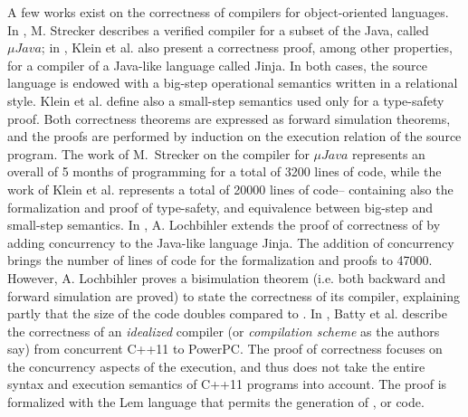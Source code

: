 \documentclass[pdflatex,sn-mathphys]{sn-jnl}%
\theoremstyle{thmstyleone}%
\theoremstyle{thmstyletwo}%
\theoremstyle{thmstylethree}%
\begin{document}
A few works exist on the correctness of compilers for object-oriented
languages. In \cite{Strecker2002}, M. Strecker describes a verified
compiler for a subset of the Java, called $\mu{}Java$; in
\cite{Klein2006}, Klein et al. also present a correctness proof, among
other properties, for a compiler of a Java-like language called Jinja.
In both cases, the source language is endowed with a big-step
operational semantics written in a relational style. Klein et
al. define also a small-step semantics used only for a type-safety
proof. Both correctness theorems are expressed as forward simulation
theorems, and the proofs are performed by induction on the execution
relation of the source program. The work of M.~Strecker on the
compiler for $\mu{}Java$ represents an overall of 5 months of
programming for a total of 3200 lines of \isahol{} code, while the
work of Klein et al. represents a total of 20000 lines of \isahol{}
code-- containing also the formalization and proof of type-safety, and
equivalence between big-step and small-step semantics. In
\cite{Lochbihler2010}, A. Lochbihler extends the proof of correctness
of \cite{Klein2006} by adding concurrency to the Java-like language
Jinja. The addition of concurrency brings the number of lines of
\isahol{} code for the formalization and proofs to 47000. However,
A. Lochbihler proves a bisimulation theorem (i.e. both backward and
forward simulation are proved) to state the correctness of its
compiler, explaining partly that the size of the code doubles compared
to \cite{Klein2006}. In \cite{Batty2012}, Batty et al. describe the
correctness of an \textit{idealized} compiler (or \textit{compilation
  scheme} as the authors say) from concurrent C++11 to PowerPC. The
proof of correctness focuses on the concurrency aspects of the
execution, and thus does not take the entire syntax and execution
semantics of C++11 programs into account. The proof is formalized with
the \textsf{Lem} language that permits the generation of \isahol{},
\coq{} or \ocaml{} code.
\end{document}
